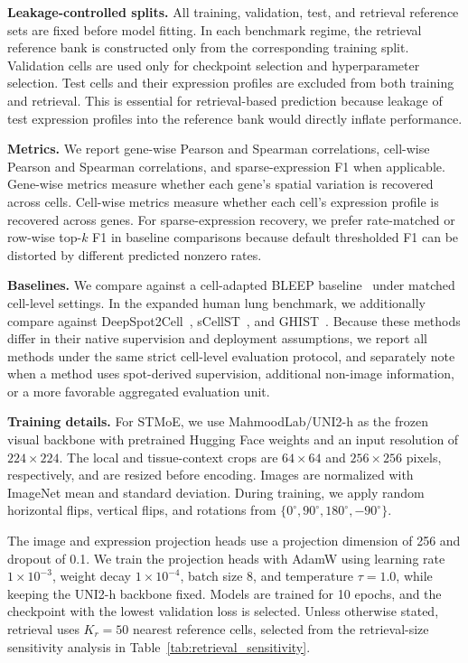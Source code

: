 \documentclass[sigconf]{acmart}
\newcommand{\method}{STMoE\xspace}
\begin{document}
\textbf{Leakage-controlled splits.}
All training, validation, test, and retrieval reference sets are fixed before model fitting. In each benchmark regime, the retrieval reference bank is constructed only from the corresponding training split. Validation cells are used only for checkpoint selection and hyperparameter selection. Test cells and their expression profiles are excluded from both training and retrieval. This is essential for retrieval-based prediction because leakage of test expression profiles into the reference bank would directly inflate performance.

\textbf{Metrics.}
We report gene-wise Pearson and Spearman correlations, cell-wise Pearson and Spearman correlations, and sparse-expression F1 when applicable. Gene-wise metrics measure whether each gene's spatial variation is recovered across cells. Cell-wise metrics measure whether each cell's expression profile is recovered across genes. For sparse-expression recovery, we prefer rate-matched or row-wise top-$k$ F1 in baseline comparisons because default thresholded F1 can be distorted by different predicted nonzero rates.

\textbf{Baselines.}
We compare against a cell-adapted BLEEP baseline~\cite{xie2023bleep} under matched cell-level settings. In the expanded human lung benchmark, we additionally compare against DeepSpot2Cell~\cite{Nonchev2025.09.23.678121}, sCellST~\cite{chadoutaud2026scellst}, and GHIST~\cite{fu2025ghist}. Because these methods differ in their native supervision and deployment assumptions, we report all methods under the same strict cell-level evaluation protocol, and separately note when a method uses spot-derived supervision, additional non-image information, or a more favorable aggregated evaluation unit.

\textbf{Training details.}
For \method{}, we use MahmoodLab/UNI2-h as the frozen visual backbone with pretrained Hugging Face weights and an input resolution of $224\times224$. The local and tissue-context crops are $64\times64$ and $256\times256$ pixels, respectively, and are resized before encoding. Images are normalized with ImageNet mean and standard deviation. During training, we apply random horizontal flips, vertical flips, and rotations from $\{0^\circ,90^\circ,180^\circ,-90^\circ\}$.

The image and expression projection heads use a projection dimension of 256 and dropout of 0.1. We train the projection heads with AdamW using learning rate $1\times10^{-3}$, weight decay $1\times10^{-4}$, batch size 8, and temperature $\tau=1.0$, while keeping the UNI2-h backbone fixed. Models are trained for 10 epochs, and the checkpoint with the lowest validation loss is selected. Unless otherwise stated, retrieval uses $K_r=50$ nearest reference cells, selected from the retrieval-size sensitivity analysis in Table~\ref{tab:retrieval_sensitivity}.
\end{document}
